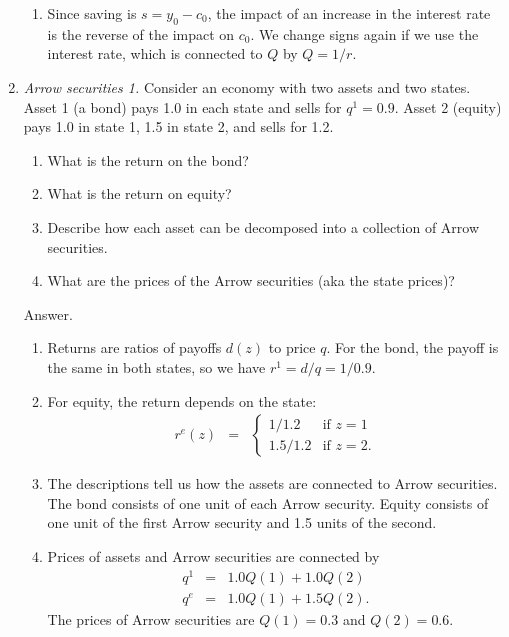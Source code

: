 \documentclass[11pt]{article}
\begin{document}
\begin{enumerate}
\begin{enumerate}
\item Since saving is $ s = y_0-c_0$,
the impact of an increase in the interest rate is the reverse of the impact on $c_0$.
We change signs again if we use the interest rate, which is connected to $Q$ by $Q=1/r$.

\end{enumerate}

\item {\it Arrow securities 1.\/}
Consider an economy with two assets and two states.
Asset 1 (a bond) pays 1.0 in each state and sells for $q^1 = 0.9$.
Asset 2 (equity) pays 1.0 in state 1, 1.5 in state 2, and sells for 1.2.
\begin{enumerate}
\item What is the return on the bond?
\item What is the return on equity?
\item Describe how each asset can be decomposed into a collection of Arrow securities.
\item What are the prices of the Arrow securities (aka the state prices)?
\end{enumerate}
%
Answer.
\begin{enumerate}
\item Returns are ratios of payoffs $d(z)$ to price $q$.
For the bond, the payoff is the same in both states, so we have
$ r^1 = d/q = 1/0.9 $.
\item For equity, the return depends on the state:
\begin{eqnarray*}
    r^e(z) &=& \left\{
                \begin{array}{ll}
                1/1.2 & \mbox{if } z=1 \\  1.5/1.2 & \mbox{if } z=2 .
                \end{array}
                \right.
\end{eqnarray*}
\item The descriptions tell us how the assets are connected to Arrow securities.
The bond consists of one unit of each Arrow security.
Equity consists of one unit of the first Arrow security and 1.5 units of the second.
\item Prices of assets and Arrow securities are connected by
\begin{eqnarray*}
    q^1 &=& 1.0 Q(1) + 1.0 Q(2) \\
    q^e &=& 1.0 Q(1) + 1.5 Q(2) .
\end{eqnarray*}
The prices of Arrow securities are
$Q(1) = 0.3$ and $Q(2) = 0.6$.
\end{enumerate}


\end{enumerate}
\end{document}

